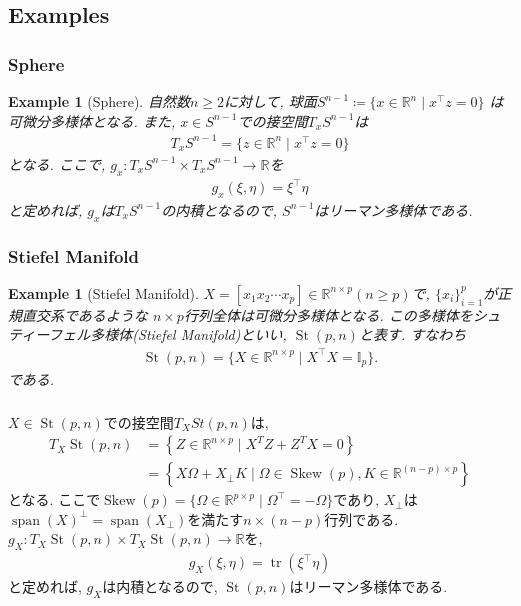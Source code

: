 \documentclass[dvipdfmx,11pt]{beamer}		%
\newtheorem{exam}[defi]{Example}
\newcommand{\R}{\mathbb{R}}
\begin{document}
    \subsection{Examples}
    \begin{frame}\frametitle{Sphere}
        \begin{exam}[Sphere]
            自然数$n\geq2$に対して, 球面$S^{n - 1}\coloneqq\{x\in\R^n\mid x^{\top}z = 0\}$
            は可微分多様体となる. また, $x\in S^{n - 1}$での接空間$T_xS^{n-1}$は
            \begin{align*}
                T_xS^{n - 1} = \{z\in\R^n\mid x^{\top}z = 0\}
            \end{align*}
            となる. ここで, $g_x : T_xS^{n - 1}\times T_xS^{n - 1}\to\R$を
            \begin{align*}
                g_x(\xi, \eta) = \xi^{\top}\eta
            \end{align*}
            と定めれば, $g_x$は$T_xS^{n-1}$の内積となるので, $S^{n - 1}$はリーマン多様体である.
        \end{exam}
    \end{frame}
    \begin{frame}\frametitle{Stiefel Manifold}
        \begin{exam}[Stiefel Manifold]
            $X = [x_1x_2\cdots x_p]\in\R^{n\times p}(n\geq p)$で, $\{x_i\}_{i = 1}^p$が正規直交系であるような
            $n\times p$行列全体は可微分多様体となる. この多様体をシュティーフェル多様体(Stiefel Manifold)といい, 
            $\operatorname{St}(p, n)$と表す. すなわち
            \begin{align*}
                \operatorname{St}(p, n) = \{X\in\R^{n\times p}\mid X^{\top}X = \mathbb{I}_{p}\}.
            \end{align*}
            である.
        \end{exam}
    \end{frame}

    \begin{frame}\frametitle{}
        $X\in\operatorname{St}(p, n)$での接空間$T_{X}St(p, n)$は, 
        \begin{align*}
            T_{X} \operatorname{St}(p, n)&=\left\{Z \in \mathbb{R}^{n \times p}\mid X^{T} Z+Z^{T} X=0\right\}\\
                                         &= \left\{X \Omega+X_{\perp} K\mid \Omega\in\operatorname{Skew}(p), K \in \mathbb{R}^{(n-p) \times p}\right\}
        \end{align*}
        となる. ここで$\operatorname{Skew}(p) = \{\Omega\in\R^{p\times p}\mid \Omega^{\top} = -\Omega\}$であり, 
        $X_{\perp}$は$\operatorname{span}(X)^{\perp} = \operatorname{span}(X_{\perp})$を満たす$n\times (n - p)$行列である.
        $g_{X} : T_{X}\operatorname{St}(p, n)\times T_{X}\operatorname{St}(p, n)\to\R$を,
        \begin{align*}
            g_{X}(\xi, \eta) = \operatorname{tr}(\xi^{\top} \eta)
        \end{align*}
        と定めれば, $g_{X}$は内積となるので, $\operatorname{St}(p, n)$はリーマン多様体である. 
    \end{frame}
\end{document}
